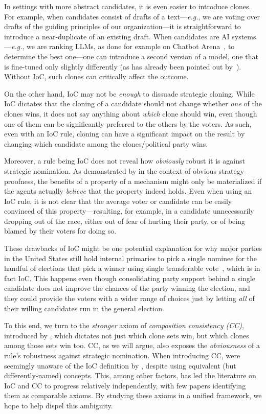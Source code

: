 In settings with more abstract candidates, it is even easier to introduce clones. For example, when candidates consist of drafts of a text---\emph{e.g.}, we are voting over drafts of the guiding principles of our organization---it is straightforward to introduce a near-duplicate of an existing draft.  When candidates are AI systems---\emph{e.g.}, we are ranking LLMs, as done for example on Chatbot Arena~\citep{Chiang24:Chatbot}, to determine the best one---one can introduce a second version of a model, one that is fine-tuned only slightly differently (as has already been pointed out by~\citet{Conitzer24:Position}).  Without IoC, such clones can critically affect the outcome. 

On the other hand, IoC may not be \emph{enough} to dissuade strategic cloning. While IoC dictates that the cloning of a candidate should not change whether \emph{one} of the clones wins, it does not say anything about \emph{which} clone should win, even though one of them can be significantly preferred to the others by the voters. As such, even with an IoC rule, cloning can have a significant impact on the result by changing which candidate among the clones/political party wins.

Moreover, a rule being IoC does not reveal how \emph{obviously} robust it is against strategic nomination. As demonstrated by \citet{Li17:Obviously} in the context of obvious strategy-proofness, the benefits of a property of a mechanism might only be materialized if the agents actually \emph{believe} that the property indeed holds. Even when using an IoC rule, it is not clear that the average voter or candidate can be easily convinced of this property---resulting, for example, in a candidate unnecessarily dropping out of the race, either out of fear of hurting their party, or of being blamed by their voters for doing so.

These drawbacks of IoC might be one potential explanation for why major parties in the United States still hold internal primaries to pick a single nominee for the handful of elections that pick a winner using single transferable vote~\citep{Richie23:Case}, which is in fact IoC. This happens even though consolidating party support behind a single candidate does not improve the chances of the party winning the election, and they could provide the voters with a wider range of choices just by letting \emph{all} of their willing candidates run in the general election.

To this end, we turn to the \emph{stronger} axiom of \emph{composition consistency (CC)}, introduced by \citet{Laffond96:Composition}, which dictates not just which clone sets win, but which clones among those sets win too. CC, as we will argue, also exposes the \emph{obviousness} of a rule's robustness against strategic nomination. When introducing CC, \citeauthor{Laffond96:Composition} were seemingly unaware of the IoC definition by \citet{Tideman87:Independence}, despite using equivalent (but differently-named) concepts. This, among other factors, has led the literature on IoC and CC to progress relatively independently, with few papers identifying them as comparable axioms. By studying these axioms in a unified framework, we hope to help dispel this ambiguity.

